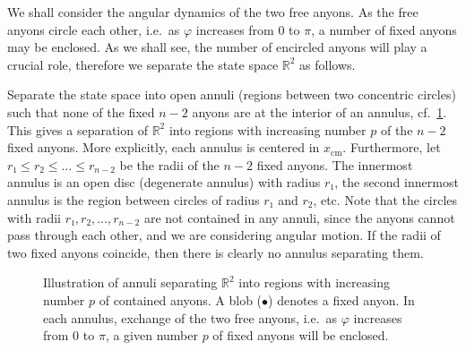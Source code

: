 We shall consider the angular dynamics of the two free anyons. As the free anyons circle each other, i.e.\ as $\varphi$ increases from $0$ to $π$, a number of fixed anyons may be enclosed. As we shall see, the number of encircled anyons will play a crucial role, therefore we separate the state space $ℝ^2$ as follows.

Separate the state space into open annuli (regions between two concentric circles) such that none of the fixed $n-2$ anyons are at the interior of an annulus, cf.\ \cref{fig:annuli}. This gives a separation of $ℝ^2$ into regions with increasing number $p$ of the $n-2$ fixed anyons. More explicitly, each annulus is centered in $x_\text{cm}$. Furthermore, let $r₁ \le r_2 \le … \le r_{n-2}$ be the radii of the $n-2$ fixed anyons. The innermost annulus is an open disc (degenerate annulus) with radius $r₁$, the second innermost annulus is the region between circles of radius $r₁$ and $r_2$, etc. Note that the circles with radii $r₁, r_2, …, r_{n-2}$ are not contained in any annuli, since the anyons cannot pass through each other, and we are considering angular motion. If the radii of two fixed anyons coincide, then there is clearly no annulus separating them.

\begin{figure}[h]
  \centering
  \caption{Illustration of annuli separating $ℝ^2$ into regions with increasing number $p$ of contained anyons. A blob ($\bullet$) denotes a fixed anyon. In each annulus, exchange of the two free anyons, i.e.\ as $\varphi$ increases from $0$ to $\pi$, a given number $p$ of fixed anyons will be enclosed.}
  \label{fig:annuli}
\end{figure}

